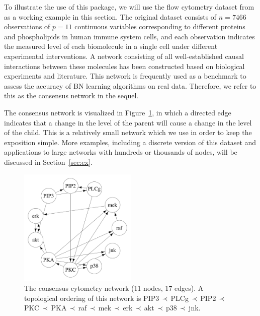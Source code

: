 \documentclass[article]{jss}
\renewcommand{\|}{\,|\,}
\begin{document}
To illustrate the use of this package, we will use the flow cytometry dataset from \citet{sachs2005} as a working example in this section. The original dataset consists of $n=7466$ observations of $p=11$ continuous variables corresponding to different proteins and phospholipids in human immune system cells, and each observation indicates the measured level of each biomolecule in a single cell under different experimental interventions. A network consisting of all well-established causal interactions between these molecules has been constructed based on biological experiments and literature. This network is frequently used as a benchmark to assess the accuracy of BN learning algorithms on real data.
Therefore, we refer to this as the consensus network in the sequel.

The consensus network is visualized in Figure~\ref{fig:cyto:network}, in which a directed edge indicates that a change in the level of the parent will cause a change in the level of the child. This is a relatively small network which we use in order to keep the exposition simple. More examples, including a discrete version of this dataset and applications to large networks with hundreds or thousands of nodes, will be discussed in Section~\ref{sec:ex}.

\begin{figure}[t!]
\centering
\includegraphics[width=0.5\textwidth]{cytometry.pdf}
\caption{The consensus cytometry network (11 nodes, 17 edges). A topological ordering of this network is PIP3$\,\prec\,$PLCg$\,\prec\,$PIP2$\,\prec\,$PKC$\,\prec\,$PKA$\,\prec\,$raf$\,\prec\,$mek$\,\prec\,$erk$\,\prec\,$akt$\,\prec\,$p38$\,\prec\,$jnk.}
\label{fig:cyto:network}
\end{figure}
\end{document}
